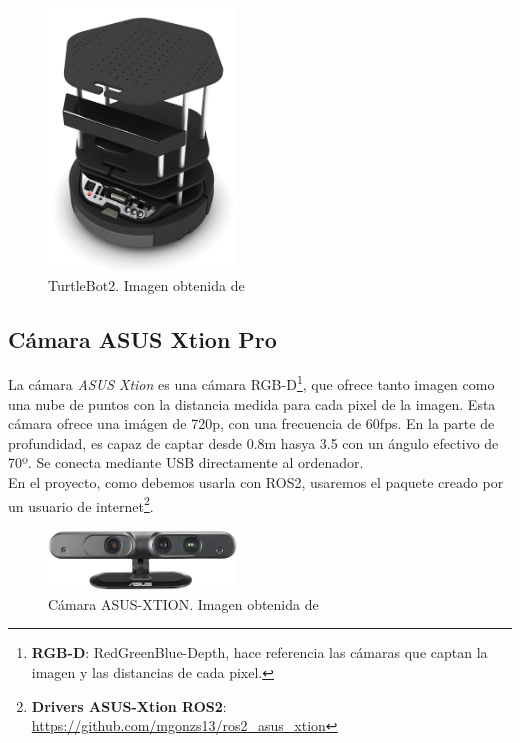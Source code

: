 \begin{figure} [H]
    \begin{center}
        \includegraphics[width=5cm]{figs/c3/turtlebot2_body.jpg}
    \end{center}
    \caption[TurtleBot2]{TurtleBot2. Imagen obtenida de \cite{turtlebot_2_structure}}
    \label{fig:turtlebot_2_structure}
\end{figure}

\subsection{Cámara ASUS Xtion Pro}
\label{subsec:asus_xtion}
La cámara \textit{ASUS Xtion} es una cámara RGB-D\footnote{\textbf{RGB-D}: RedGreenBlue-Depth, hace referencia las cámaras que captan la imagen y
las distancias de cada pixel.}, que ofrece tanto imagen como una nube de puntos con la distancia medida para cada pixel de la imagen.
Esta cámara ofrece una imágen de 720p, con una frecuencia de 60fps. En la parte de profundidad, es capaz de captar desde 0.8m hasya 3.5 con un
ángulo efectivo de 70º. Se conecta mediante USB directamente al ordenador.\\
En el proyecto, como debemos usarla con ROS2, usaremos el paquete creado por un usuario de
internet\footnote{\textbf{Drivers ASUS-Xtion ROS2}: \url{https://github.com/mgonzs13/ros2_asus_xtion}}.\\
\begin{figure} [H]
    \begin{center}
        \includegraphics[width=5cm]{figs/c3/asus_xtion.jpg}
    \end{center}
    \caption[Cámara ASUS-XTION]{Cámara ASUS-XTION. Imagen obtenida de \cite{asus_xtion}}
    \label{fig:asus_xtion}
\end{figure}

